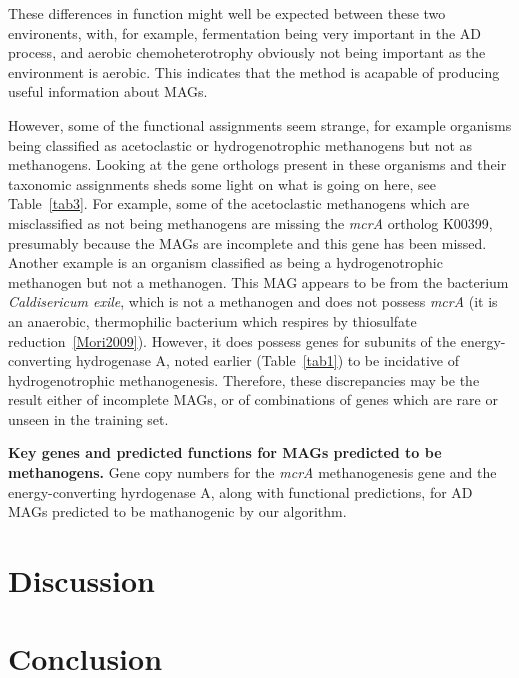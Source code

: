 \documentclass[10pt,letterpaper]{article}
\begin{document}
These differences in function might well be expected between these two environents, with, for example, fermentation being very important in the AD process, and aerobic chemoheterotrophy obviously not being important as the environment is aerobic. This indicates that the method is acapable of producing useful information about MAGs.

However, some of the functional assignments seem strange, for example organisms being classified as acetoclastic or hydrogenotrophic methanogens but not as methanogens. Looking at the gene orthologs present in these organisms and their taxonomic assignments sheds some light on what is going on here, see Table~\ref{tab3}. For example, some of the acetoclastic methanogens which are misclassified as not being methanogens are missing the \emph{mcrA} ortholog K00399, presumably because the MAGs are incomplete and this gene has been missed. Another example is an organism classified as being a hydrogenotrophic methanogen but not a methanogen. This MAG appears to be from the bacterium \emph{Caldisericum exile}, which is not a methanogen and does not possess \emph{mcrA} (it is an anaerobic, thermophilic bacterium which respires by thiosulfate reduction~\ref{Mori2009}). However, it does possess genes for subunits of the energy-converting hydrogenase A, noted earlier (Table~\ref{tab1}) to be incidative of hydrogenotrophic methanogenesis. Therefore, these discrepancies may be the result either of incomplete MAGs, or of combinations of genes which are rare or unseen in the training set.

\begin{table}
\scriptsize
{}

\caption{{\bf Key genes and predicted functions for MAGs predicted to be methanogens.}
Gene copy numbers for the \emph{mcrA} methanogenesis gene and the energy-converting hyrdogenase A, along with functional predictions, for AD MAGs predicted to be mathanogenic by our algorithm.}\label{tab3}
\end{table}


\section*{Discussion}


\section*{Conclusion}
\end{document}
